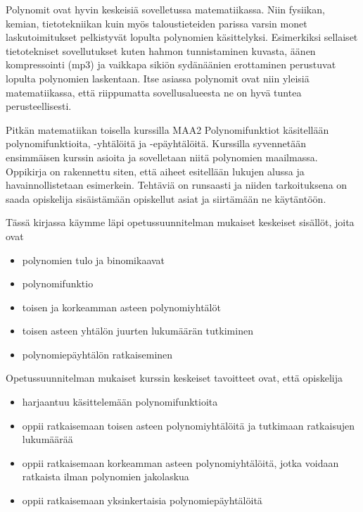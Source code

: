 Polynomit ovat hyvin keskeisiä sovelletussa matematiikassa. Niin fysiikan, kemian, tietotekniikan kuin myös taloustieteiden parissa varsin monet laskutoimitukset pelkistyvät lopulta polynomien käsittelyksi. Esimerkiksi sellaiset tietotekniset sovellutukset kuten hahmon tunnistaminen kuvasta, äänen kompressointi (mp3) ja vaikkapa sikiön sydänäänien erottaminen perustuvat lopulta polynomien laskentaan. Itse asiassa polynomit ovat niin yleisiä matematiikassa, että riippumatta sovellusalueesta ne on hyvä tuntea perusteellisesti.

Pitkän matematiikan toisella kurssilla MAA2 Polynomifunktiot käsitellään polynomifunktioita, -yhtälöitä ja -epäyhtälöitä. Kurssilla syvennetään ensimmäisen kurssin asioita ja sovelletaan niitä polynomien maailmassa. Oppikirja on rakennettu siten, että aiheet esitellään lukujen alussa ja havainnollistetaan esimerkein. Tehtäviä on runsaasti ja niiden tarkoituksena on saada opiskelija sisäistämään opiskellut asiat ja siirtämään ne käytäntöön.

Tässä kirjassa käymme läpi opetussuunnitelman mukaiset keskeiset sisällöt, joita ovat
\begin{itemize}
\item polynomien tulo ja binomikaavat
\item polynomifunktio
\item toisen ja korkeamman asteen polynomiyhtälöt
\item toisen asteen yhtälön juurten lukumäärän tutkiminen
\item polynomiepäyhtälön ratkaiseminen
\end{itemize}

Opetussuunnitelman mukaiset kurssin keskeiset tavoitteet ovat, että opiskelija
\begin{itemize}
\item harjaantuu käsittelemään polynomifunktioita
\item oppii ratkaisemaan toisen asteen polynomiyhtälöitä ja tutkimaan ratkaisujen lukumäärää
\item oppii ratkaisemaan korkeamman asteen polynomiyhtälöitä, jotka voidaan ratkaista ilman polynomien jakolaskua
\item oppii ratkaisemaan yksinkertaisia polynomiepäyhtälöitä
\end{itemize}

